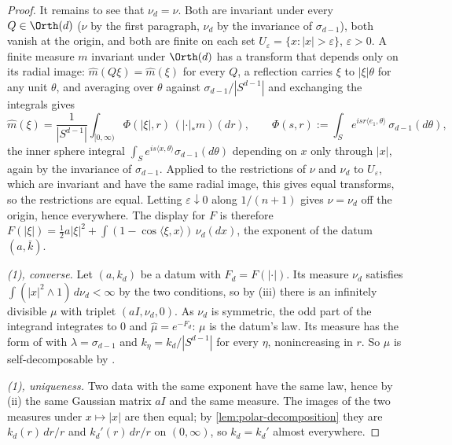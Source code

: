 \begin{proof}
It remains to see that $\nu_d = \nu$. Both are invariant under every $Q \in \Orth(d)$ ($\nu$ by the
first paragraph, $\nu_d$ by the invariance of $\sigma_{d-1}$), both vanish at the origin, and both
are finite on each set $U_\varepsilon = \{x : |x| > \varepsilon\}$, $\varepsilon > 0$. A finite
measure $m$ invariant under $\Orth(d)$ has a transform that depends only on its radial image:
$\widehat m(Q\xi) = \widehat m(\xi)$ for every $Q$, a reflection carries $\xi$ to $|\xi|\theta$ for
any unit $\theta$, and averaging over $\theta$ against $\sigma_{d-1}/|S^{d-1}|$ and exchanging the
integrals gives
\[
  \widehat m(\xi) = \frac{1}{|S^{d-1}|}\int_{[0,\infty)}\Phi(|\xi|,r)\,(|\cdot|_*m)(dr) ,
  \qquad
  \Phi(s,r) := \int_S e^{i s r\langle e_1,\theta\rangle}\,\sigma_{d-1}(d\theta) ,
\]
the inner sphere integral $\int_S e^{i s\langle x,\theta\rangle}\sigma_{d-1}(d\theta)$ depending on
$x$ only through $|x|$, again by the invariance of $\sigma_{d-1}$. Applied to the restrictions of
$\nu$ and $\nu_d$ to $U_\varepsilon$, which are invariant and have the same radial image, this gives
equal transforms, so the restrictions are equal. Letting $\varepsilon \downarrow 0$ along
$1/(n+1)$ gives $\nu = \nu_d$ off the origin, hence everywhere. The display for $F$ is therefore
$F(|\xi|) = \tfrac12 a|\xi|^2 + \int(1 - \cos\langle\xi,x\rangle)\,\nu_d(dx)$, the exponent of the
datum $(a, \bar k)$.

\emph{(1), converse.} Let $(a,k_d)$ be a datum with $F_d = F(|\cdot|)$. Its \Levy{} measure
$\nu_d$ satisfies $\int(|x|^2 \wedge 1)\,d\nu_d < \infty$ by the two conditions, so by
(iii) there is an infinitely divisible $\mu$ with triplet $(aI, \nu_d, 0)$. As $\nu_d$
is symmetric, the odd part of the integrand integrates to $0$ and
$\widehat\mu = e^{-F_d}$: $\mu$ is the datum's law. Its \Levy{} measure has the form of
 with $\lambda = \sigma_{d-1}$ and $k_\eta = k_d/|S^{d-1}|$ for every $\eta$,
nonincreasing in $r$. So $\mu$ is self-decomposable by .

\emph{(1), uniqueness.} Two data with the same exponent have the same law, hence by (ii)
the same Gaussian matrix $aI$ and the same \Levy{} measure. The images of the two \Levy{}
measures under $x \mapsto |x|$ are then equal; by \ref{lem:polar-decomposition} they are
$k_d(r)\,dr/r$ and $k_d'(r)\,dr/r$ on $(0,\infty)$, so $k_d = k_d'$ almost everywhere.


\end{proof}
